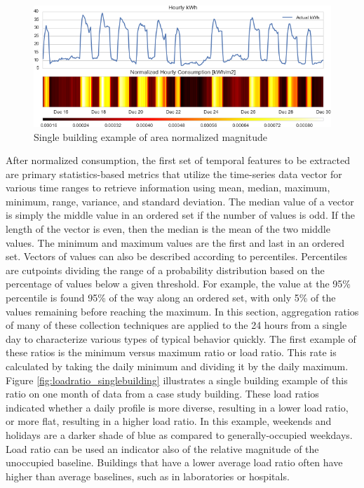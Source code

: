 \begin{figure}[ht!]
\begin{center}
\includegraphics[width=1\columnwidth]{figures/normalizedcons_example/normalizedcons_example}
\caption{Single building example of area normalized magnitude
\label{fig:normalizedmag}%
}
\end{center}
\end{figure}



After normalized consumption, the first set of temporal features to be extracted are primary statistics-based metrics that utilize the time-series data vector for various time ranges to retrieve information using mean, median, maximum, minimum, range, variance, and standard deviation. The median value of a vector is simply the middle value in an ordered set if the number of values is odd. If the length of the vector is even, then the median is the mean of the two middle values. The minimum and maximum values are the first and last in an ordered set. Vectors of values can also be described according to percentiles. Percentiles are cutpoints dividing the range of a probability distribution based on the percentage of values below a given threshold. For example, the value at the 95\% percentile is found 95\% of the way along an ordered set, with only 5\% of the values remaining before reaching the maximum. In this section, aggregation ratios of many of these collection techniques are applied to the 24 hours from a single day to characterize various types of typical behavior quickly. The first example of these ratios is the minimum versus maximum ratio or load ratio. This rate is calculated by taking the daily minimum and dividing it by the daily maximum. Figure \ref{fig:loadratio_singlebuilding} illustrates a single building example of this ratio on one month of data from a case study building. These load ratios indicated whether a daily profile is more diverse, resulting in a lower load ratio, or more flat, resulting in a higher load ratio. In this example, weekends and holidays are a darker shade of blue as compared to generally-occupied weekdays. Load ratio can be used an indicator also of the relative magnitude of the unoccupied baseline. Buildings that have a lower average load ratio often have higher than average baselines, such as in laboratories or hospitals.

